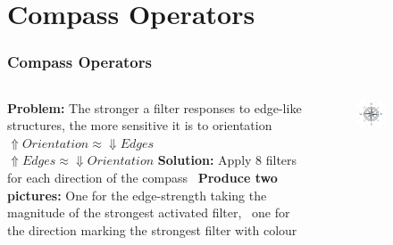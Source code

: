 \section{Compass Operators}
\begin{frame}
\frametitle{Compass Operators}
\begin{columns}
	\begin{column}{0.69\textwidth}
		\textbf{Problem:} The stronger a filter responses to edge-like structures, the more sensitive it is to orientation \newline
		$\Uparrow Orientation \approx \Downarrow Edges$ $ \Uparrow Edges \approx \Downarrow Orientation $ \newline
		\textbf{Solution:} Apply 8 filters for each direction of the compass ~\newline \textbf{Produce two pictures:} One for the edge-strength taking the magnitude of the strongest activated filter, ~\newline one for the direction marking the strongest filter with colour 
	\end{column}
	\begin{column}{0.29\textwidth}
		\begin{figure}
			\centering
			\includegraphics[width=0.45\textwidth]{images/Kompass}
			\label{fig:Kompass}
		\end{figure}
	\end{column}	
\end{columns}
\end{frame}

